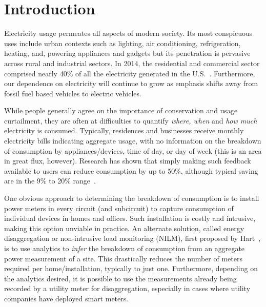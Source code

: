 \section{Introduction}
Electricity usage permeates all aspects of modern society.
Its most conspicuous
uses include urban contexts such as
lighting, air conditioning, refrigeration, heating, and, powering
appliances and gadgets but its penetration is pervasive across rural
and industrial sectors.
In 2014, the residential and commercial sector
comprised nearly 40\% of all the electricity generated in the 
U.S.~\cite{book2014us}.
Furthermore, our dependence on electricity will continue to grow
as emphasis shifts away from fossil fuel based vehicles to electric
vehicles.

While people generally agree on the importance of conservation and
usage curtailment, they are often at difficulties to quantify 
{\em where, when} and {\em how much} electricity is consumed.
Typically, residences and businesses receive
monthly electricity bills indicating aggregate usage, with no information on
the breakdown of consumption by appliances/devices, time of day, or day of
week (this is an area in great flux, however). Research has 
shown that simply making such feedback available to users
can reduce consumption by up to 50\%, although typical saving 
are in the 9\% to 20\% range~\cite{book2014us}.



One obvious approach to determining the breakdown of consumption is to install
power meters in every circuit (and subcircuit)
to capture consumption of individual devices in homes and
offices. Such installation is costly and intrusive, making 
this option unviable in practice. 
An alternate
solution, called energy disaggregation or non-intrusive load monitoring
(NILM),
first proposed by Hart~\cite{hart1992}, is to use analytics to 
{\em infer} the breakdown of consumption from an aggregate 
power measurement of a
site. This drastically reduces the number of meters required per 
home/installation, typically to just one. Furthermore, depending on the analytics desired, it is possible to
use the measurements already being recorded by a utility meter for
disaggregation, especially in cases where utility companies have deployed
smart meters.

